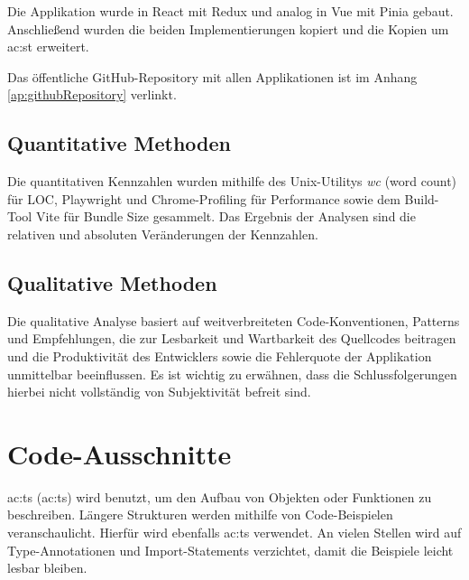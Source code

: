 Die Applikation wurde in React mit Redux und analog in Vue mit Pinia gebaut. Anschließend wurden die beiden Implementierungen kopiert und die Kopien um \acrlong{ac:st} erweitert.

Das öffentliche GitHub-Repository mit allen Applikationen ist im Anhang \ref{ap:githubRepository} verlinkt.

\subsection{Quantitative Methoden}
Die quantitativen Kennzahlen wurden mithilfe des Unix-Utilitys \textit{wc} (word count) für LOC, Playwright und Chrome-Profiling für Performance sowie dem Build-Tool Vite für Bundle Size gesammelt. Das Ergebnis der Analysen sind die relativen und absoluten Veränderungen der Kennzahlen.

\subsection{Qualitative Methoden}
Die qualitative Analyse basiert auf weitverbreiteten Code-Konventionen, Patterns und Empfehlungen, die zur Lesbarkeit und Wartbarkeit des Quellcodes beitragen und die Produktivität des Entwicklers sowie die Fehlerquote der Applikation unmittelbar beeinflussen. Es ist wichtig zu erwähnen, dass die Schlussfolgerungen hierbei nicht vollständig von Subjektivität befreit sind.

\section{Code-Ausschnitte}

\acrlong{ac:ts} (\acrshort{ac:ts}) wird benutzt, um den Aufbau von Objekten oder Funktionen zu beschreiben. Längere Strukturen werden mithilfe von Code-Beispielen veranschaulicht. Hierfür wird ebenfalls \acrlong{ac:ts} verwendet. An vielen Stellen wird auf Type-Annotationen und Import-Statements verzichtet, damit die Beispiele leicht lesbar bleiben.
